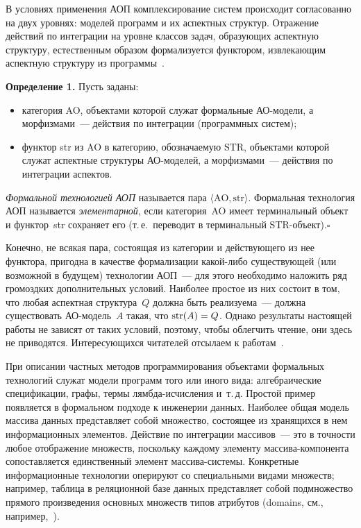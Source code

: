 \begin{multicols}{2}
   В условиях применения АОП комплексирование сис\-тем происходит 
согласованно на двух уровнях: моделей программ и их аспектных струк\-тур. 
Отражение действий по интеграции на \mbox{уровне} классов задач, образующих 
аспектную структуру, естественным образом формализуется функтором, 
извлекающим аспектную структуру из программы~\cite{13-kov}.
  
  \medskip
  
  \noindent
  \textbf{Определение 1.} Пусть заданы:
   \begin{itemize}
\item категория AO, объектами которой служат формальные 
АО-мо\-де\-ли, а 
морфизмами~--- действия по интеграции (программных систем);
\item функтор str из AO в категорию, обозна\-ча\-емую STR, объектами 
которой служат аспектные структуры АО-мо\-де\-лей, а морфизмами~--- 
действия по интеграции аспектов.
\end{itemize}

\textit{Формальной технологией АОП} называется пара $\langle \mathrm{AO}, \mathrm{str}\rangle$. Формальная 
технология АОП называется \textit{элементарной}, если категория~AO имеет 
терминальный объект и функтор~str сохраняет его (т.\,е.\ переводит в 
терминальный STR-объект).\hfill$\square$
   
   Конечно, не всякая пара, состоящая из категории и действующего из нее 
функтора, пригодна в качестве формализации ка\-кой-ли\-бо сущест\-ву\-ющей 
(или возможной в будущем) технологии АОП~--- для этого необходимо 
наложить ряд громоздких дополнительных условий. Наиболее простое из них 
состоит в том, что любая аспектная структура~$Q$ должна быть реализуема~--- 
должна существовать АО-мо\-дель~$A$ такая, что $\mathrm{str}(A) \hm= Q$. Однако 
результаты настоящей работы не зависят от таких условий, поэтому, чтобы 
облегчить чтение, они здесь не приводятся. Интересующихся читателей 
отсылаем к работам~\cite{14-kov, 15-kov}.
   
   
   
   При описании частных методов программирования объектами формальных 
технологий служат модели программ того или иного вида: алгебраические 
спецификации, графы, термы лямб\-да-ис\-чис\-ле\-ния и~т.\,д. Простой пример 
появляется в формальном подходе к инженерии данных. Наиболее общая 
модель массива данных представляет собой множество, состоящее из 
хранящихся в нем информационных элементов. Действие по интеграции 
массивов~--- это в точности любое отображение множеств, поскольку каждому 
элементу мас\-си\-ва-ком\-по\-нен\-та со\-по\-став\-ля\-ет\-ся единственный элемент 
мас\-си\-ва-сис\-те\-мы. Конкретные информационные технологии оперируют со 
специальными видами множеств; например, таблица в реляционной базе данных 
представляет собой подмножество прямого произведения основных множеств 
типов атрибутов (domains, см., например,~\cite{16-kov}). 


\end{multicols}
